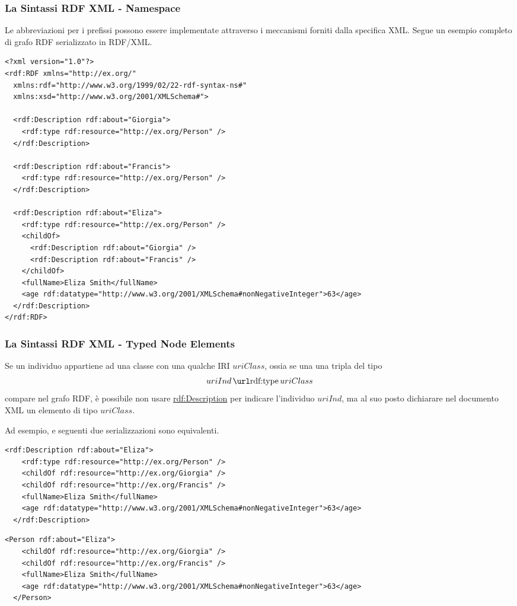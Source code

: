 \documentclass[8pt]{beamer}
\begin{document}
\begin{frame}[fragile]
 \frametitle{La Sintassi RDF XML - Namespace}
Le abbreviazioni per i prefissi possono essere implementate attraverso
i meccanismi forniti dalla specifica XML. Segue un esempio completo
di grafo RDF serializzato in RDF/XML.
\vspace{\baselineskip}

\begin{Verbatim}[fontsize=\small]
<?xml version="1.0"?>
<rdf:RDF xmlns="http://ex.org/"
  xmlns:rdf="http://www.w3.org/1999/02/22-rdf-syntax-ns#"
  xmlns:xsd="http://www.w3.org/2001/XMLSchema#">

  <rdf:Description rdf:about="Giorgia">
    <rdf:type rdf:resource="http://ex.org/Person" />
  </rdf:Description>

  <rdf:Description rdf:about="Francis">
    <rdf:type rdf:resource="http://ex.org/Person" />
  </rdf:Description>
  
  <rdf:Description rdf:about="Eliza">
    <rdf:type rdf:resource="http://ex.org/Person" />
    <childOf>
      <rdf:Description rdf:about="Giorgia" />
      <rdf:Description rdf:about="Francis" />
    </childOf>    
    <fullName>Eliza Smith</fullName>
    <age rdf:datatype="http://www.w3.org/2001/XMLSchema#nonNegativeInteger">63</age>
  </rdf:Description>
</rdf:RDF>
\end{Verbatim}
\end{frame}

\begin{frame}[fragile]
 \frametitle{La Sintassi RDF XML - Typed Node Elements}
 
Se un individuo appartiene ad una classe con  
una qualche IRI $uriClass$, ossia se una una tripla del 
tipo
\[
 uriInd\,\mathurl{rdf:type}\,uriClass
\]
compare nel grafo RDF, \`e possibile non usare \url{rdf:Description}
per indicare l'individuo $uriInd$, ma al suo posto dichiarare
nel documento XML un elemento di tipo $uriClass$.
\vspace{\baselineskip}

Ad esempio, e seguenti due serializzazioni sono equivalenti.

\begin{Verbatim}[fontsize=\small]
  <rdf:Description rdf:about="Eliza">
    <rdf:type rdf:resource="http://ex.org/Person" />
    <childOf rdf:resource="http://ex.org/Giorgia" />
    <childOf rdf:resource="http://ex.org/Francis" />
    <fullName>Eliza Smith</fullName>
    <age rdf:datatype="http://www.w3.org/2001/XMLSchema#nonNegativeInteger">63</age>
  </rdf:Description>
\end{Verbatim}

\begin{Verbatim}[fontsize=\small]
  <Person rdf:about="Eliza">
    <childOf rdf:resource="http://ex.org/Giorgia" />
    <childOf rdf:resource="http://ex.org/Francis" />
    <fullName>Eliza Smith</fullName>
    <age rdf:datatype="http://www.w3.org/2001/XMLSchema#nonNegativeInteger">63</age>
  </Person>
\end{Verbatim}
\end{frame}
\end{document}
